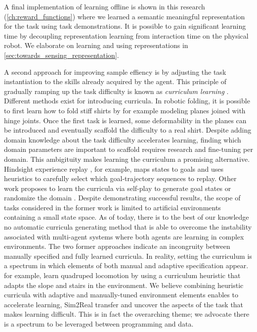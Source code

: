 \documentclass[\home/main.tex]{subfiles}
\begin{document}
A final implementation of learning offline is shown in this research (\cref{ch:reward_functions}) where we learned a semantic meaningful representation for the task using task demonstrations. It is possible to gain significant learning time by decoupling representation learning from interaction time on the physical robot. We elaborate on learning and using representations in \cref{sec:towards_sensing_representation}. 

A second approach for improving sample effiency is by adjusting the task instantiation to the skills already acquired by the agent. This principle of gradually ramping up the task difficulty is known as \emph{curriculum learning} \autocite{Selfridge1985}. Different methods exist for introducing curricula. In robotic folding, it is possible to first learn how to fold stiff shirts by for example modeling planes joined with hinge joints. Once the first task is learned, some deformability in the planes can be introduced and eventually scaffold the difficulty to a real shirt. Despite adding domain knowledge about the task difficulty accelerates learning, finding which domain parameters are important to scaffold requires research and fine-tuning per domain. This ambigituity makes learning the curriculum a promising alternative.  
Hindsight experience replay \autocite{andrychowicz2017hindsight}, for example, maps states to goals and uses heuristics to carefully select which goal-trajectory sequences to replay. Other work proposes to learn the curricula via self-play to generate goal states \autocite{sukhbaatar2017intrinsic} or randomize the domain \autocite{raparthy2020generating}. Despite demonstrating successful results, the scope of tasks considered in the former work is limited to artificial environments containing a small state space. As of today, there is to the best of our knowledge no automatic curricula generating method that is able to overcome the instability associated with multi-agent systems where both agents are learning in complex environments.
The two former approaches indicate an incongruity between manually specified and fully learned curricula. In reality, setting the curriculum is a spectrum in which elements of both manual and adaptive specification appear. \textcite{rudin2021learning} for example, learn quadruped locomotion by using a curriculum heuristic that adapts the slope and stairs in the environment. 
We believe combining heuristic curricula with adaptive and manually-tuned environment elements enables to accelerate learning, Sim2Real transfer and uncover the aspects of the task that makes learning difficult. This is in fact the overarching theme; we advocate there is a spectrum to be leveraged between programming and data. 
\end{document}

